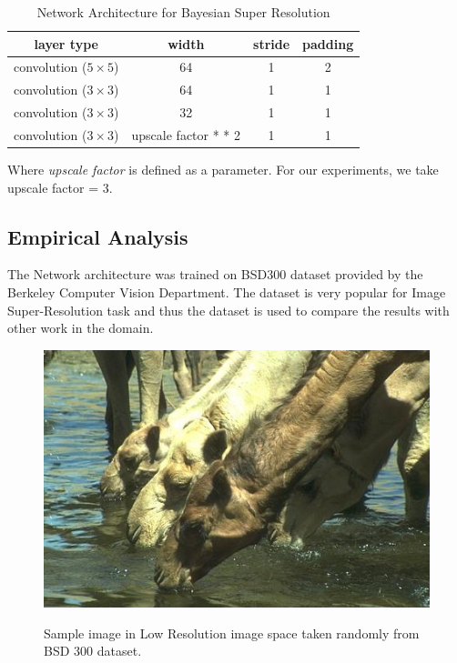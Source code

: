 \begin{table}[H]
    \centering
    \renewcommand{\arraystretch}{2}
    \begin{tabular}{c c c c } 
 \hline
 layer type & width & stride & padding  \\ [0.5ex] 
 \hline
 convolution ($5\times5$) & 64 & 1 & 2 \\
 
 convolution ($3\times3$) & 64 & 1 & 1 \\
 
 
 convolution ($3\times3$) & 32 & 1 & 1 \\
 
 convolution ($3\times3$) & upscale factor * * 2 & 1 & 1  \\ [1ex] 
 \hline
\end{tabular}
\renewcommand{\arraystretch}{1.5}
\label{tab:SuperResolutionArchitecture}
\caption{Network Architecture for Bayesian Super Resolution}
\end{table}

Where \textit{upscale factor} is defined as a parameter. For our experiments, we take upscale factor = 3. 

\subsection{Empirical Analysis}

The Network architecture was trained on BSD300 dataset \cite{MartinFTM01} provided by the Berkeley Computer Vision Department. The dataset is very popular for Image Super-Resolution task and thus the dataset is used to compare the results with other work in the domain. 

\begin{figure}[H]
\begin{center}
\includegraphics[height=.28\textheight]{Chapter6/Figs/camel_LR.png}
\label{fig:CamelLR}
\caption{Sample image in Low Resolution image space taken randomly from BSD 300 \cite{MartinFTM01} dataset.}
\end{center}
\end{figure}

